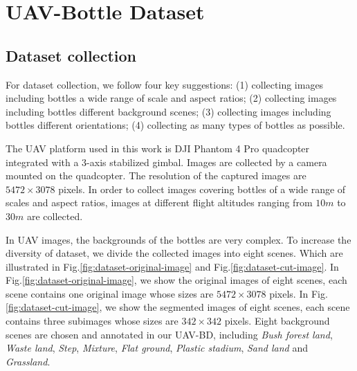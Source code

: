 \section{UAV-Bottle Dataset}
\label{sec:dataset}


\subsection{Dataset collection}
\label{ssec:image_collection}


For dataset collection, we follow four key suggestions: (1) collecting images including bottles a wide range of scale and aspect ratios; (2) collecting images including bottles different background scenes; (3) collecting images including bottles different orientations; (4) collecting as many types of bottles as possible.

The UAV platform used in this work is DJI Phantom 4 Pro quadcopter integrated with a 3-axis stabilized gimbal. Images are collected by a camera mounted on the quadcopter. The resolution of the captured images are $ 5472\times 3078 $ pixels. In order to collect images covering bottles of a wide range of scales and aspect ratios, images at different flight altitudes ranging from $ 10m $ to $ 30m $ are collected.

In UAV images, the backgrounds of the bottles are very complex. To increase the diversity of dataset, we divide the collected images into eight scenes. Which are illustrated in Fig.\ref{fig:dataset-original-image} and Fig.\ref{fig:dataset-cut-image}. In Fig.\ref{fig:dataset-original-image}, we show the original images of eight scenes, each scene contains one original image whose sizes are $ 5472\times 3078 $ pixels. In Fig.\ref{fig:dataset-cut-image}, we show the segmented images of eight scenes, each scene contains three subimages whose sizes are $ 342 \times 342 $ pixels. Eight background scenes are chosen and annotated in our UAV-BD, including \textit{Bush forest land}, \textit{Waste land}, \textit{Step}, \textit{Mixture}, \textit{Flat ground}, \textit{Plastic stadium}, \textit{Sand land} and \textit{Grassland}.



